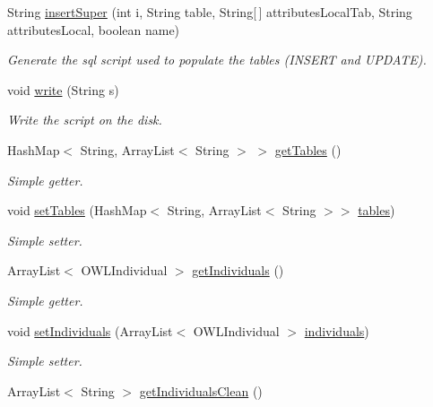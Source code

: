 \begin{DoxyCompactItemize}
String \hyperlink{class_data_base_1_1_individuals_a0699518228103b4a15b5216cf1b6fc1c}{insertSuper} (int i, String table, String\mbox{[}$\,$\mbox{]} attributesLocalTab, String attributesLocal, boolean name)
\begin{DoxyCompactList}\small\item\em Generate the sql script used to populate the tables (INSERT and UPDATE). \end{DoxyCompactList}\item 
void \hyperlink{class_data_base_1_1_individuals_ac2bdba826ce8df48d9a01ba5fe0f4291}{write} (String s)
\begin{DoxyCompactList}\small\item\em Write the script on the disk. \end{DoxyCompactList}\item 
HashMap$<$ String, ArrayList$<$ String $>$ $>$ \hyperlink{class_data_base_1_1_individuals_a2774244bf7f4184092f16df48f881d8b}{getTables} ()
\begin{DoxyCompactList}\small\item\em Simple getter. \end{DoxyCompactList}\item 
void \hyperlink{class_data_base_1_1_individuals_a02ef08587b5dc8a30069efeb3d716e87}{setTables} (HashMap$<$ String, ArrayList$<$ String $>$$>$ \hyperlink{class_data_base_1_1_individuals_ae6a515b85461d50ad21ac1051c5133b1}{tables})
\begin{DoxyCompactList}\small\item\em Simple setter. \end{DoxyCompactList}\item 
ArrayList$<$ OWLIndividual $>$ \hyperlink{class_data_base_1_1_individuals_ad1f009e87c04b913a721481baa9ae6d4}{getIndividuals} ()
\begin{DoxyCompactList}\small\item\em Simple getter. \end{DoxyCompactList}\item 
void \hyperlink{class_data_base_1_1_individuals_a49267b47171258c37405a0e6dfa98e61}{setIndividuals} (ArrayList$<$ OWLIndividual $>$ \hyperlink{class_data_base_1_1_individuals_a08ea25eeecb245fe06a36c95be656b3f}{individuals})
\begin{DoxyCompactList}\small\item\em Simple setter. \end{DoxyCompactList}\item 
ArrayList$<$ String $>$ \hyperlink{class_data_base_1_1_individuals_a7130376df06f7d960915d20d45cf2393}{getIndividualsClean} ()
$$
\end{DoxyCompactItemize}
